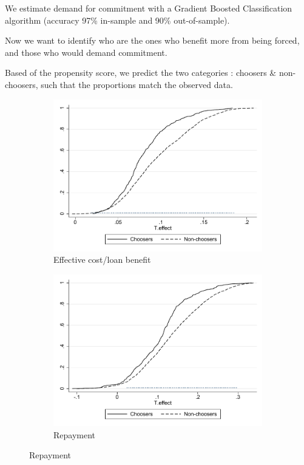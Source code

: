 \documentclass[oneside,11pt]{article}
\begin{document}
We estimate demand for commitment with a Gradient Boosted Classification algorithm (accuracy 97\% in-sample and 90\% out-of-sample).


Now we want to identify who are the ones who benefit more from being forced, and those who would demand commitment.



Based of the propensity score, we predict the two categories : choosers \& non-choosers, such that the proportions match the observed data.

\begin{figure}[H]
    \caption{}
    \label{}
    \begin{center}
    \begin{subfigure}{0.475\textwidth}
        \caption{Effective cost/loan benefit}
        \centering
        \includegraphics[width=\textwidth]{Figuras/cdf_predchoose_tau_eff.pdf}
    \end{subfigure}
    \begin{subfigure}{0.475\textwidth}
        \caption{Repayment}
        \centering
        \includegraphics[width=\textwidth]{Figuras/cdf_predchoose_tau_des.pdf}
    \end{subfigure}
  

\end{center}
\end{figure}
\end{document}
